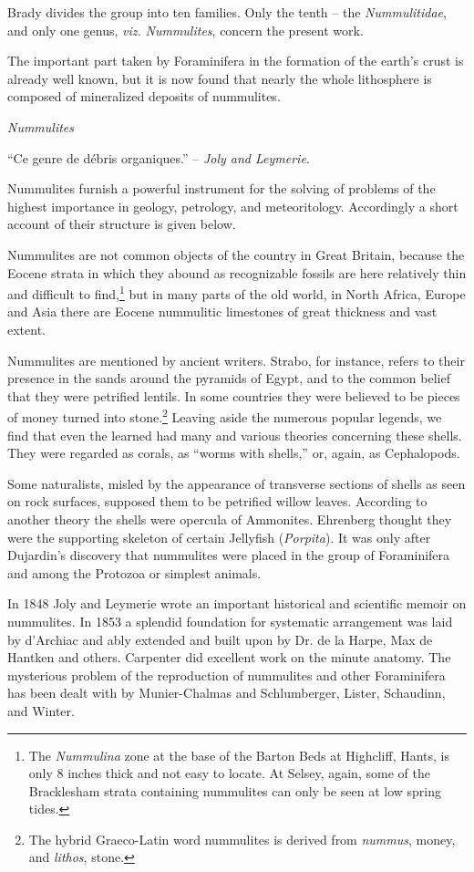 \documentclass[a4paper, 12pt, oneside]{article}
\begin{document}
Brady divides the group into ten families. Only the tenth -- the \emph{Nummulitidae}, and only one genus, \emph{viz.} \emph{Nummulites}, concern the present work.

The important part taken by Foraminifera in the formation of the earth's crust is already well known, but it is now found that nearly the whole lithosphere is composed of mineralized deposits of nummulites.

\emph{Nummulites}

``Ce genre de débris organiques.'' -- \emph{Joly and Leymerie}.

Nummulites furnish a powerful instrument for the solving of problems of the highest importance in geology, petrology, and meteoritology. Accordingly a short account of their structure is given below.

Nummulites are not common objects of the country in Great Britain, because the Eocene strata in which they abound as recognizable fossils are here relatively thin and difficult to find,\footnote{The \emph{Nummulina} zone at the base of the Barton Beds at Highcliff, Hants, is only 8 inches thick and not easy to locate. At Selsey, again, some of the Bracklesham strata containing nummulites can only be seen at low spring tides.} but in many parts of the old world, in North Africa, Europe and Asia there are Eocene nummulitic limestones of great thickness and vast extent.

Nummulites are mentioned by ancient writers. Strabo, for instance, refers to their presence in the sands around the pyramids of Egypt, and to the common belief that they were petrified lentils. In some countries they were believed to be pieces of money turned into stone.\footnote{The hybrid Graeco-Latin word nummulites is derived from \emph{nummus}, money, and \emph{lithos}, stone.} Leaving aside the numerous popular legends, we find that even the learned had many and various theories concerning these shells. They were regarded as corals, as ``worms with shells,'' or, again, as Cephalopods.

Some naturalists, misled by the appearance of transverse sections of shells as seen on rock surfaces, supposed them to be petrified willow leaves. According to another theory the shells were opercula of Ammonites. Ehrenberg thought they were the supporting skeleton of certain Jellyfish (\emph{Porpita}). It was only after Dujardin's discovery that nummulites were placed in the group of Foraminifera and among the Protozoa or simplest animals.

In 1848 Joly and Leymerie wrote an important historical and scientific memoir on nummulites. In 1853 a splendid foundation for systematic arrangement was laid by d'Archiac and ably extended and built upon by Dr. de la Harpe, Max de Hantken and others. Carpenter did excellent work on the minute anatomy. The mysterious problem of the reproduction of nummulites and other Foraminifera has been dealt with by Munier-Chalmas and Schlumberger, Lister, Schaudinn, and Winter.
\end{document}
